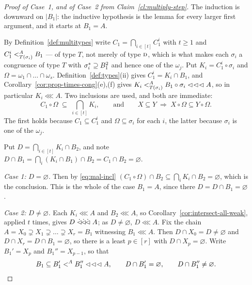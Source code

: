 \begin{proof}[Proof of Case~1, and of Case~2 from Claim~\ref{cl:multiply-step}]
The induction is downward on $|B_{1}|$: the inductive hypothesis is the lemma
for every larger first argument, and it starts at $B_{1}=A$.

By Definition~\ref{def:multitypes} write $C_{1}=\bigcap_{i\in[t]}C_{1}^{i}$
with $t\ge1$ and $C_{1}^{i}\subt[A]{T(\sigma_{i})}B_{1}$ --- of type $T$, not
merely of type $\TD$, which is what makes each $\sigma_{i}$ a congruence of type
$T$ with $\cover{\sigma_{i}}\supseteq B_{1}^{2}$ and hence one of the
$\omega_{j}$. Put $K_{i}=C_{1}^{i}\circ\sigma_{i}$ and
$\Omega=\omega_{1}\cap\dots\cap\omega_{s}$. Definition~\ref{def:types}(ii)
gives $C_{1}^{i}=K_{i}\cap B_{1}$, and
Corollary~\ref{cor:prop-times-cong}(e),(f) gives
$K_{i}\subt[A]{T(\sigma_{i})}B_{1}\circ\sigma_{i}\lll A$, so in particular
$K_{i}\lll A$. Two inclusions are used, and both are immediate:
\begin{equation}\label{eq:mal-incl}
  C_{1}\circ\Omega\;\subseteq\;\bigcap_{i\in[t]}K_{i},
  \qquad\text{and}\qquad
  X\subseteq Y\;\Longrightarrow\;X\circ\Omega\subseteq Y\circ\Omega .
\end{equation}
The first holds because $C_{1}\subseteq C_{1}^{i}$ and
$\Omega\subseteq\sigma_{i}$ for each $i$, the latter because $\sigma_{i}$ is
one of the $\omega_{j}$.

Put $D=\bigcap_{i\in[t]}K_{i}\cap B_{2}$, and note
$D\cap B_{1}=\bigcap_{i}(K_{i}\cap B_{1})\cap B_{2}=C_{1}\cap B_{2}=
\varnothing$.

\emph{Case 1: $D=\varnothing$.} Then by \eqref{eq:mal-incl}
$(C_{1}\circ\Omega)\cap B_{2}\subseteq\bigcap_{i}K_{i}\cap B_{2}=\varnothing$,
which is the conclusion. This is the whole of the case $B_{1}=A$, since there
$D=D\cap B_{1}=\varnothing$.

\emph{Case 2: $D\neq\varnothing$.} Each $K_{i}\lll A$ and $B_{2}\lll A$, so
Corollary~\ref{cor:intersect-all-weak}, applied $t$ times, gives
$D\dlll A$; as $D\neq\varnothing$, $D\lll A$. Fix the chain
$A=X_{0}\supsetneq X_{1}\supsetneq\dots\supsetneq X_{r}=B_{1}$ witnessing
$B_{1}\lll A$. Then $D\cap X_{0}=D\neq\varnothing$ and $D\cap X_{r}=
D\cap B_{1}=\varnothing$, so there is a least $p\in[r]$ with
$D\cap X_{p}=\varnothing$. Write $B_{1}'=X_{p}$ and $B_{1}''=X_{p-1}$, so that
\begin{equation}\label{eq:mal-step}
  B_{1}\subseteq B_{1}'\subt[A]{}B_{1}''\lll A,\qquad
  D\cap B_{1}'=\varnothing,\qquad D\cap B_{1}''\neq\varnothing .
\end{equation}


\end{proof}
